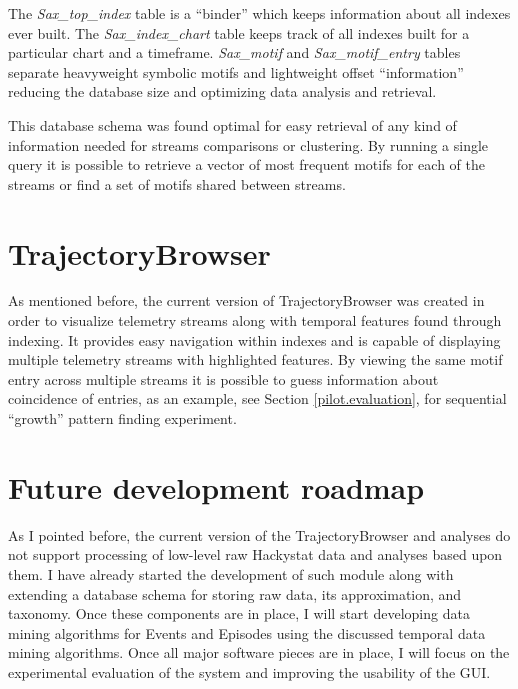 The \textit{Sax\_top\_index} table is a ``binder'' which keeps information about all indexes ever built. The \textit{Sax\_index\_chart} table keeps track of all indexes built for a particular chart and a timeframe. \textit{Sax\_motif} and \textit{Sax\_motif\_entry} tables separate heavyweight symbolic motifs and lightweight offset ``information'' reducing the database size and optimizing data analysis and retrieval. 

This database schema was found optimal for easy retrieval of any kind of information needed for streams comparisons or clustering. By running a single query it is possible to retrieve a vector of most frequent motifs for each of the streams or find a set of motifs shared between streams.

\section{TrajectoryBrowser}
As mentioned before, the current version of TrajectoryBrowser was created in order to visualize telemetry streams along with temporal features found through indexing. It provides easy navigation within indexes and is capable of displaying multiple telemetry streams with highlighted features. By viewing the same motif entry across multiple streams it is possible to guess information about coincidence of entries, as an example, see Section \ref{pilot.evaluation}, for sequential ``growth'' pattern finding experiment.

\section{Future development roadmap}
As I pointed before, the current version of the TrajectoryBrowser and analyses do not support processing of low-level raw Hackystat data and analyses based upon them. I have already started the development of such module along with extending a database schema for storing raw data, its approximation, and taxonomy. Once these components are in place, I will start developing data mining algorithms for Events and Episodes using the discussed temporal data mining algorithms. Once all major software pieces are in place, I will focus on the experimental evaluation of the system and improving the usability of the GUI.